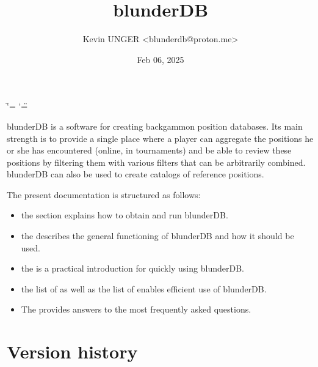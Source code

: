 \documentclass[letterpaper,10pt,english]{sphinxmanual}
\title{blunderDB}
\date{Feb 06, 2025}
\author{Kevin UNGER \textless{}blunderdb@proton.me\textgreater{}}
\begin{document}
\ifdefined\shorthandoff
  \ifnum\catcode`\=\string=\active\shorthandoff{=}\fi
  \ifnum\catcode`\"=\active{}\fi
\fi

\pagestyle{empty}
\sphinxmaketitle
\pagestyle{plain}
\sphinxtableofcontents
\pagestyle{normal}
\label{\detokenize{index::doc}}


\sphinxAtStartPar
blunderDB is a software for creating backgammon position databases. Its main strength is to provide a single place where a player can aggregate the positions he or she has encountered (online, in tournaments) and be able to review these positions by filtering them with various filters that can be arbitrarily combined. blunderDB can also be used to create catalogs of reference positions.

\sphinxAtStartPar
The present documentation is structured as follows:
\begin{itemize}
\item {} 
\sphinxAtStartPar
the  section explains how to obtain and run blunderDB.

\item {} 
\sphinxAtStartPar
the  describes the general functioning of blunderDB and how it should be used.

\item {} 
\sphinxAtStartPar
the  is a practical introduction for quickly using blunderDB.

\item {} 
\sphinxAtStartPar
the list of  as well as the list of  enables efficient use of blunderDB.

\item {} 
\sphinxAtStartPar
The  provides answers to the most frequently asked questions.

\end{itemize}


\chapter{Version history}
\label{\detokenize{index:historique-des-versions}}
\end{document}
